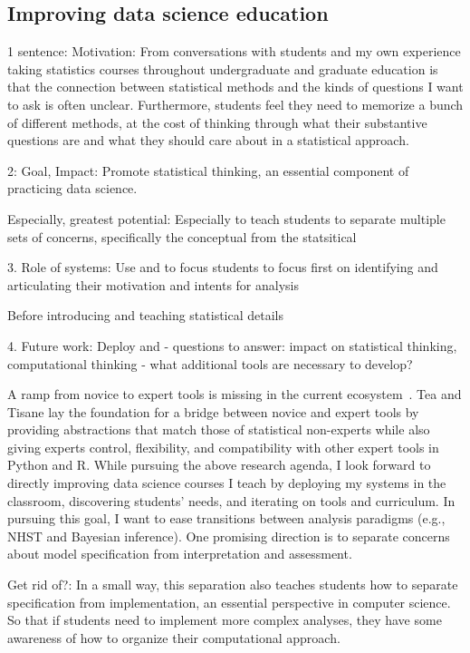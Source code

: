 \subsection{Improving data science education}

1 sentence: Motivation: From conversations with students and my own experience taking statistics courses
throughout undergraduate and graduate education is that the connection between
statistical methods and the kinds of questions I want to ask is often unclear.
Furthermore, students feel they need to memorize a bunch of different methods,
at the cost of thinking through what their substantive questions are and what
they should care about in a statistical approach. 

2: Goal, Impact: Promote statistical thinking, an essential component of practicing data science. 

Especially, greatest potential: Especially to teach students to separate
multiple sets of concerns, specifically the conceptual from the statsitical 

3. Role of systems: Use \tea and \tisane to focus students to focus first on identifying and
articulating their motivation and intents for analysis 

Before introducing and teaching statistical details

4. Future work: Deploy \tea and \tisane 
- questions to answer: impact on statistical thinking, computational thinking 
- what additional tools are necessary to develop? 

A ramp from novice to expert
tools is missing in the current ecosystem~\cite{mcnamara2018keyAttributes}. Tea
and Tisane lay the foundation for a bridge between novice and expert tools by
providing abstractions that match those of statistical non-experts while also
giving experts control, flexibility, and compatibility with other expert tools
in Python and R. While pursuing the above research agenda, I look forward to
directly improving data science courses I teach by deploying my systems in the
classroom, discovering students' needs, and iterating on tools and curriculum.
In pursuing this goal, I want to ease
transitions between analysis paradigms (e.g., NHST and Bayesian inference). One
promising direction is to separate concerns about model specification from
interpretation and assessment. 


Get rid of?: In a small way, this separation also teaches students how to separate
specification from implementation, an essential perspective in computer science.
So that if students need to implement more complex analyses, they have some
awareness of how to organize their computational approach. 


